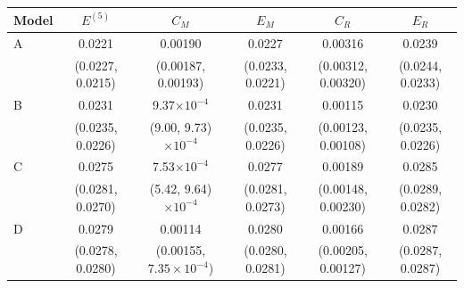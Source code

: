 \documentclass[11pt,letterpaper]{article}
\begin{document}
\begin{table}[htbp]
  \centering
  \footnotesize
  \setlength{\tabcolsep}{5pt}
\begin{tabular}{@{}l ccccc@{}}
  \toprule
  Model & $E^{(5)}$ & $C_M$ & $E_M$ & $C_R$ & $E_R$ \\
  \midrule
A & 0.0221 & 0.00190 & 0.0227 & 0.00316 & 0.0239 \\
 & \scriptsize(0.0227, 0.0215) & \scriptsize(0.00187, 0.00193) & \scriptsize(0.0233, 0.0221) & \scriptsize(0.00312, 0.00320) & \scriptsize(0.0244, 0.0233) \\
\addlinespace[2pt]
B & 0.0231 & 9.37$\times10^{-4}$ & 0.0231 & 0.00115 & 0.0230 \\
 & \scriptsize(0.0235, 0.0226) & \scriptsize(9.00, 9.73)$\times10^{-4}$ & \scriptsize(0.0235, 0.0226) & \scriptsize(0.00123, 0.00108) & \scriptsize(0.0235, 0.0226) \\
\addlinespace[2pt]
C & 0.0275 & 7.53$\times10^{-4}$ & 0.0277 & 0.00189 & 0.0285 \\
 & \scriptsize(0.0281, 0.0270) & \scriptsize(5.42, 9.64)$\times10^{-4}$ & \scriptsize(0.0281, 0.0273) & \scriptsize(0.00148, 0.00230) & \scriptsize(0.0289, 0.0282) \\
\addlinespace[2pt]
D & 0.0279 & 0.00114 & 0.0280 & 0.00166 & 0.0287 \\
 & \scriptsize(0.0278, 0.0280) & \scriptsize(0.00155, $7.35\times10^{-4}$) & \scriptsize(0.0280, 0.0281) & \scriptsize(0.00205, 0.00127) & \scriptsize(0.0287, 0.0287) \\
  \bottomrule
\end{tabular}

\vspace{8pt}


\end{table}
\end{document}
